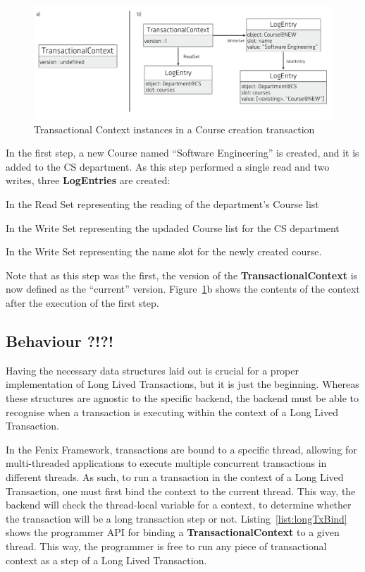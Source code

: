 \begin{figure}
\centering
\includegraphics[width=1\linewidth]{log-entries}
\caption{Transactional Context instances in a Course creation transaction}
\label{fig:course-logEntries}
\end{figure}

In the first step, a new Course named ``Software Engineering'' is
created, and it is added to the CS department. As this step performed
a single read and two writes, three {\bf LogEntries} are created: 
\begin{inparaenum}
\item In the Read Set representing the reading of the department's
  Course list
\item In the Write Set representing the updaded Course list for the CS
  department
\item In the Write Set representing the name slot for the newly
  created course.
\end{inparaenum}
Note that as this step was the first, the version of the {\bf
  TransactionalContext} is now defined as the ``current''
version. Figure~\ref{fig:course-logEntries}b shows the contents of the
context after the execution of the first step.

\subsection{Behaviour ?!?!}

Having the necessary data structures laid out is crucial for a proper
implementation of Long Lived Transactions, but it is just the
beginning. Whereas these structures are agnostic to the specific
backend, the backend must be able to recognise when a transaction is
executing within the context of a Long Lived Transaction.

In the Fenix Framework, transactions are bound to a specific thread,
allowing for multi-threaded applications to execute multiple
concurrent transactions in different threads. As such, to run a
transaction in the context of a Long Lived Transaction, one must first
bind the context to the current thread. This way, the backend will
check the thread-local variable for a context, to determine whether 
the transaction will be a long transaction step or
not. Listing~\ref{list:longTxBind} shows the programmer API for
binding a {\bf TransactionalContext} to a given thread. This way, the
programmer is free to run any piece of transactional context as a step
of a Long Lived Transaction.

